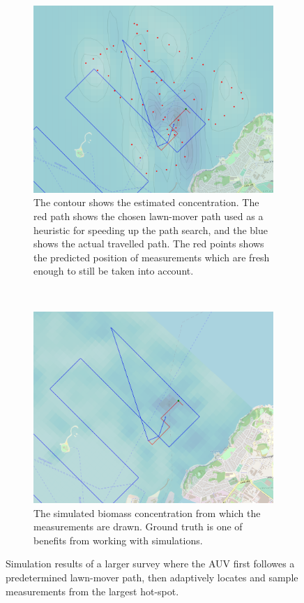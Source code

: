 \documentclass[conference]{IEEEtran}
\begin{document}
\begin{figure}[tbp]
     \centering
     \begin{subfigure}[b]{\linewidth}
         \centering
         \includegraphics[width=\textwidth]{figures/sim-estimate.png}
         \caption{The contour shows the estimated concentration. The red path shows the chosen lawn-mover path used as a heuristic for speeding up the path search, and the blue shows the actual travelled path. The red points shows the predicted position of measurements which are fresh enough to still be taken into account.}
         \label{fig:sim-estimation}
     \end{subfigure}
     \\
     \begin{subfigure}[b]{\linewidth}
         \centering
         \includegraphics[width=\textwidth]{figures/sim-gt.png}
         \caption{The simulated biomass concentration from which the measurements are drawn. Ground truth is one of benefits from working with simulations.}
         \label{fig:sim-gt}
     \end{subfigure}
        \caption{Simulation results of a larger survey where the AUV first followes a predetermined lawn-mover path, then adaptively locates and sample measurements from the largest hot-spot.}
        \label{fig:Simulation}
\end{figure}
\end{document}
